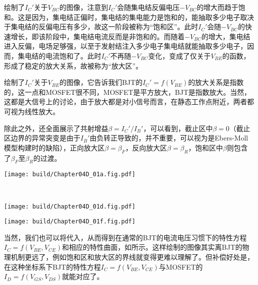 绘制了$I_C'$关于$V_{BC}$的图像，注意到$I_C'$会随集电结反偏电压$-V_{BC}$的增大而趋于饱和。这是因为，集电结正偏时，集电结的集电能力是饱和的，能抽取多少电子取决于集电结的反偏电压有多少，故这一阶段被称为“饱和区”。此时$I_C'$会随$-V_{BC}$的快速增长，即该阶段中，集电结电流反而是非饱和的。而随着$-V_{BC}$的增大，集电结进入反偏，电场足够强，以至于发射结注入多少电子集电结就能抽取多少电子，因而，集电结的电流饱和了。此时$I_C'$不再随$-V_{BC}$变化，变成了仅关于$V_{BE}$的函数，形成了稳定的放大关系，故被称为“放大区”。

绘制了$I_C'$关于$V_{BE}$的图像，它告诉我们BJT的$I_C'=f(V_{BE})$的放大关系是指数的，这一点和MOSFET很不同，MOSFET是平方放大，BJT是指数放大。当然，这都是大信号上的讨论，由于放大都是对小信号而言，在静态工作点附近，两者都可视为线性放大。

除此之外，还全面展示了共射增益$\beta=I_C'/I_B'$，可以看到，截止区中$\beta=0$（截止区边界的异常突变是由于$I_B'$由负转正导致的，并不重要，可以视为是Ebers-Moll模型构建时的缺陷），正向放大区$\beta=\beta_F$，反向放大区$\beta=\beta_R$，饱和区中$\beta$则包含了$\beta_F$至$\beta_R$的过渡。

\begin{Figure}[BJT的特性方程]
    \begin{FigureSub}[BJT的特性曲面]
        \texttt{[image: build/Chapter04D\_01a.fig.pdf]}
    \end{FigureSub}\\ \vspace{0.5cm}
    \begin{FigureSub}[BJT的转移特性]
        \texttt{[image: build/Chapter04D\_01d.fig.pdf]}
    \end{FigureSub}
    \hspace{0.25cm}
    \begin{FigureSub}[BJT的输出特性]
        \texttt{[image: build/Chapter04D\_01f.fig.pdf]}
    \end{FigureSub}
\end{Figure}

当然，我们也可以将代入，从而得到在通常的BJT的电流电压习惯下的特性方程$I_C=f(V_{BE},V_{CE})$和相应的特性曲面，如所示。这样绘制的图像其实离BJT的物理机制更远了，例如饱和区和放大区的界线就变得更难以理解了。但补偿好处是，在这种坐标系下BJT的特性方程$I_C=f(V_{BE},V_{CE})$与MOSFET的$I_D=f(V_{GS},V_{DS})$就能对应了。

